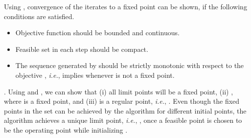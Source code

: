 Using \cite[Th. 3.1]{meyer1976sufficient}, convergence of the iterates to a fixed point can be shown, if the following conditions are satisfied.
\begin{itemize}
\item Objective function  should be bounded and continuous.
\item Feasible set  in each step should be compact.
\item The sequence  generated by  should be strictly monotonic with respect to the objective , \textit{i.e.},  implies  whenever \me{\ma} is not a fixed point.
\end{itemize}
. Using \cite{zangwill1969nonlinear} and \cite[Th. 3.1]{meyer1976sufficient}, we can show that (i) all limit points will be a fixed point, (ii) , where \eqn{\ma^\ast} is a fixed point, and (iii) \eqn{\ma^\ast} is a regular point, \textit{i.e.}, . Even though the fixed points in the set  can be achieved by the algorithm  for different initial points, the algorithm  achieves a unique limit point, \textit{i.e.}, , once a feasible point is chosen to be the operating point while initializing .

